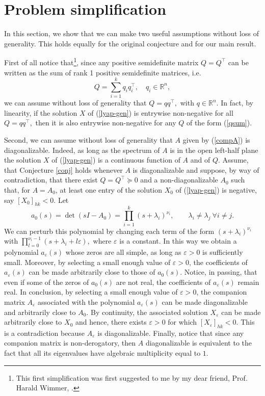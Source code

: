 \documentclass[12pt]{article}
\def\R{\mathbb{R}}
\newcommand{\tp}{^{\top}}
\newcommand{\beq}{\begin{equation}}
\newcommand{\eeq}{\end{equation}}
\begin{document}
\section{Problem simplification}

In this section, we show that we can make two useful assumptions without loss of generality.
This holds equally for the original conjecture and for our main result. 

First of all notice that\footnote{This first simplification was first suggested to me by my dear friend, Prof. Harald Wimmer, \cite{harald-pc}.}, since any positive semidefinite matrix $Q=Q\tp$ can be written as the sum of rank 1 positive semidefinite  matrices, i.e.
\beq\label{qsum}
Q=\sum_{i=1}^k q_iq_i\tp,\quad q_i\in\R^n,
\eeq
we can assume  without loss of
generality that $Q=qq\tp,$ with $q\in\R^n$. 
In fact, by linearity, if the solution $X$ of (\ref{lyap-gen}) is entrywise non-negative for all
$Q=qq\tp,$ then it is also  entrywise non-negative for any $Q$ of the form (\ref{qsum}).


Second, we can assume without loss of generality that $A$ given by (\ref{compA}) is diagonalizable.
Indeed, as long as the spectrum of $A$ is in the open left-half plane the solution $X$ 
of (\ref{lyap-gen}) is a continuous function of $A$ and of $Q$. Assume,
that Conjecture \ref{conj} holds whenever $A$ is diagonalizable and suppose, by way of contradiction, that there exist $Q=Q\tp\succeq  0$ and a non-diagonalizable  $A_0$ such that, for $A=A_0$, at least one entry  of the solution $X_0$ of (\ref{lyap-gen}) is negative, say  $[X_0]_{hk}<0$.
Let
$$
a_0(s)=\det(sI-A_0)=\prod_{i=1}^k (s+\lambda_i)^{\nu_i},\qquad \lambda_i\neq\lambda_j\ \forall i\neq j.
$$
We can perturb this polynomial by changing each term of the form $(s+\lambda_i)^{\nu_i}$ with
$\prod_{l=0}^{\nu_i-1}(s+\lambda_i+l\varepsilon),$ where $\varepsilon$ is a constant.
In this way we obtain a polynomial $a_\varepsilon(s)$ whose zeros are all simple, as long as
$\varepsilon>0$ is sufficiently small. Moreover, by selecting a small enough value of $\varepsilon>0$, the coefficients of $a_\varepsilon(s)$ can be made arbitrarily close to those of $a_0(s)$. Notice, in passing, that even if some of the zeros of $a_0(s)$ are not real, the coefficients of $a_\varepsilon(s)$ remain  real.
In conclusion, by selecting a small enough value of $\varepsilon>0$, the companion matrix $A_\varepsilon$ associated with the polynomial $a_\varepsilon(s)$  can be made diagonalizable and arbitrarily close to
$A_0$. By continuity, the associated solution $X_\varepsilon$ can be made arbitrarily close to
$X_0$ and hence, there exists $\varepsilon>0$ for which $[X_\varepsilon]_{hk}<0$.
This is a contradiction because $A_\varepsilon$ is diagonalizable.
Finally, notice that since any companion matrix is non-derogatory, then $A$ diagonalizable is equivalent to the fact that all its eigenvalues have algebraic multiplicity equal to $1$.
\end{document}
